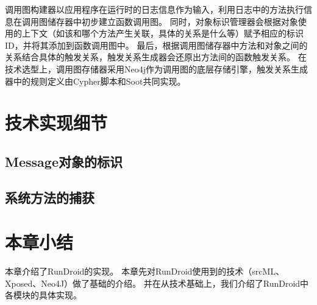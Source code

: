 调用图构建器以应用程序在运行时的日志信息作为输入，利用日志中的方法执行信息在调用图储存器中初步建立函数调用图。
同时，对象标识管理器会根据对象使用的上下文（如该和哪个方法产生关联，具体的关系是什么等）赋予相应的标识ID，并将其添加到函数调用图中。
最后，根据调用图储存器中方法和对象之间的关系结合具体的触发关系，触发关系生成器会还原出方法间的函数触发关系。
在技术选型上，调用图存储器采用Neo4j作为调用图的底层存储引擎，触发关系生成器中的规则定义由Cypher脚本和Soot共同实现。

\section{技术实现细节}


\subsection{Message对象的标识}
\subsection{系统方法的捕获}


 \section{本章小结}

本章介绍了RunDroid的实现。
本章先对RunDroid使用到的技术（srcML、Xposed、Neo4J）做了基础的介绍。
并在从技术基础上，我们介绍了RunDroid中各模块的具体实现。

